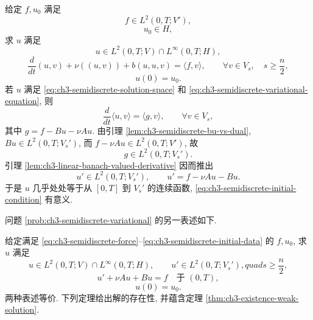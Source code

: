 \MBProblemHeading
\label{prob:ch3-semidiscrete-variational}
给定 $f,u_0$ 满足
\begin{equation}
f\in L^2(0,T;V'),
\label{eq:ch3-semidiscrete-force}
\end{equation}
\begin{equation}
u_0\in H,
\label{eq:ch3-semidiscrete-initial-data}
\end{equation}
求 $u$ 满足
\begin{equation}
u\in L^2(0,T;V)\cap L^\infty(0,T;H),
\label{eq:ch3-semidiscrete-solution-space}
\end{equation}
\begin{equation}
\frac d{dt}(u,v)+\nu((u,v))+b(u,u,v)=\langle f,v\rangle,
\qquad\forall v\in V_s,\quad s\geq\frac n2,
\label{eq:ch3-semidiscrete-variational-equation}
\end{equation}
\begin{equation}
u(0)=u_0.
\label{eq:ch3-semidiscrete-initial-condition}
\end{equation}
若 $u$ 满足 \eqref{eq:ch3-semidiscrete-solution-space} 和 \eqref{eq:ch3-semidiscrete-variational-equation}, 则
\[
\frac d{dt}\langle u,v\rangle=\langle g,v\rangle,
\qquad\forall v\in V_s,
\]
其中 $g=f-Bu-\nu Au$. 由引理 \ref{lem:ch3-semidiscrete-bu-vs-dual}, $Bu\in L^2(0,T;V_s')$, 而 $f-\nu Au\in L^2(0,T;V')$, 故
\begin{equation}
g\in L^2(0,T;V_s').
\label{eq:ch3-semidiscrete-g-space}
\end{equation}
引理 \ref{lem:ch3-linear-banach-valued-derivative} 因而推出
\begin{equation}
u'\in L^2(0,T;V_s'),
\qquad u'=f-\nu Au-Bu.
\label{eq:ch3-semidiscrete-time-derivative}
\end{equation}
于是 $u$ 几乎处处等于从 $[0,T]$ 到 $V_s'$ 的连续函数, \eqref{eq:ch3-semidiscrete-initial-condition} 有意义.

问题 \ref{prob:ch3-semidiscrete-variational} 的另一表述如下.

\MBProblemHeading
\label{prob:ch3-semidiscrete-operator}
给定满足 \eqref{eq:ch3-semidiscrete-force}--\eqref{eq:ch3-semidiscrete-initial-data} 的 $f,u_0$, 求 $u$ 满足
\begin{equation}
u\in L^2(0,T;V)\cap L^\infty(0,T;H),
\qquad u'\in L^2(0,T;V_s'),quad s\geq\frac n2,
\label{eq:ch3-semidiscrete-operator-space}
\end{equation}
\begin{equation}
u'+\nu Au+Bu=f\quad\text{于 }(0,T),
\label{eq:ch3-semidiscrete-operator-equation}
\end{equation}
\begin{equation}
u(0)=u_0.
\label{eq:ch3-semidiscrete-operator-initial}
\end{equation}
两种表述等价. 下列定理给出解的存在性, 并蕴含定理 \ref{thm:ch3-existence-weak-solution}.

